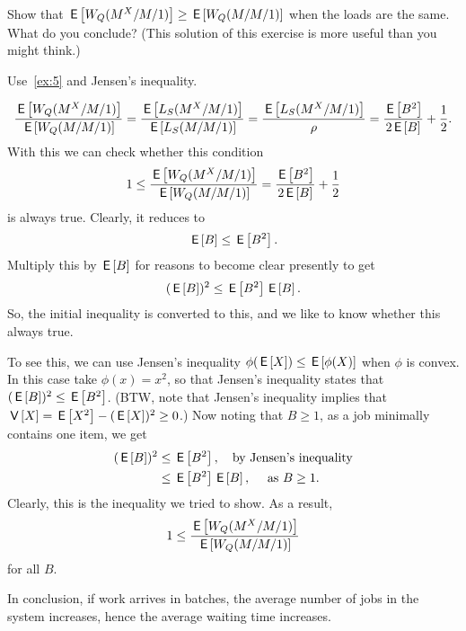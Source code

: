 \begin{exercise}
 Show that $\,\mathsf{E}\left[W_Q(M^X/M/1)\right] \geq \,\mathsf{E}\left[W_Q(M/M/1)\right]$ when the loads are the same.
 What do you conclude? (This solution of this exercise is more useful than you might think.)
\begin{hint}
Use~\cref{ex:5} and Jensen's inequality. 
\end{hint}
\begin{solution}
 \begin{equation*}
 \frac{\,\mathsf{E}\left[W_Q(M^X/M/1)\right]}{\,\mathsf{E}\left[W_Q(M/M/1)\right]} = \frac{\,\mathsf{E}\left[L_S(M^X/M/1)\right]}{\,\mathsf{E}\left[L_S(M/M/1)\right]} = \frac{\,\mathsf{E}\left[L_S(M^X/M/1)\right]}{\rho} = 
\frac{\,\mathsf{E}\left[B^2\right]}{2\,\mathsf{E}\left[B\right]} + \frac 12.
 \end{equation*}
With this we can check whether this condition
 \begin{equation*}
 1\leq \frac{\,\mathsf{E}\left[W_Q(M^X/M/1)\right]}{\,\mathsf{E}\left[W_Q(M/M/1)\right]} = \frac{\,\mathsf{E}\left[B^2\right]}{2\,\mathsf{E}\left[B\right]} + \frac 12
 \end{equation*}
 is always true. Clearly, it reduces to
\begin{equation*}
\,\mathsf{E}\left[B\right] \leq \,\mathsf{E}\left[B^2\right].
\end{equation*}
Multiply this by $\,\mathsf{E}\left[B\right]$ for reasons to become clear presently to get
\begin{equation*}
(\,\mathsf{E}\left[B\right])^2 \leq \,\mathsf{E}\left[B^2\right] \,\mathsf{E}\left[B\right].
\end{equation*}
So, the initial inequality is converted to this, and we like to know
whether this always true.


To see this, we can use Jensen's inequality $\phi(\,\mathsf{E}\left[X\right]) \leq \,\mathsf{E}\left[\phi(X)\right]$ when $\phi$ is convex.
In this case take $\phi(x)=x^2$, so that Jensen's inequality states that $(\,\mathsf{E}\left[B\right])^2 \leq \,\mathsf{E}\left[B^2\right]$.
(BTW, note that Jensen's inequality implies that $\,\mathsf{V}\left[X\right] = \,\mathsf{E}\left[X^2\right] - (\,\mathsf{E}\left[X\right])^2\geq 0$.)
Now noting that $B\geq 1$, as a job minimally contains one item, we get
\begin{equation*}
 \begin{split}
(\,\mathsf{E}\left[B\right])^2 
&\leq \,\mathsf{E}\left[B^2\right], \quad{\text{by Jensen's inequality}} \\
&\leq \,\mathsf{E}\left[B^2\right] \,\mathsf{E}\left[B\right], \quad{\text{ as } B \geq 1}.
 \end{split}
\end{equation*}
Clearly, this is the inequality we tried to show. As a result,
 \begin{equation*}
 1\leq \frac{\,\mathsf{E}\left[W_Q(M^X/M/1)\right]}{\,\mathsf{E}\left[W_Q(M/M/1)\right]}
 \end{equation*}
for all $B$. 

In conclusion, if work arrives in batches, the average number of jobs
in the system increases, hence the average waiting time increases.
\end{solution}
\end{exercise}


